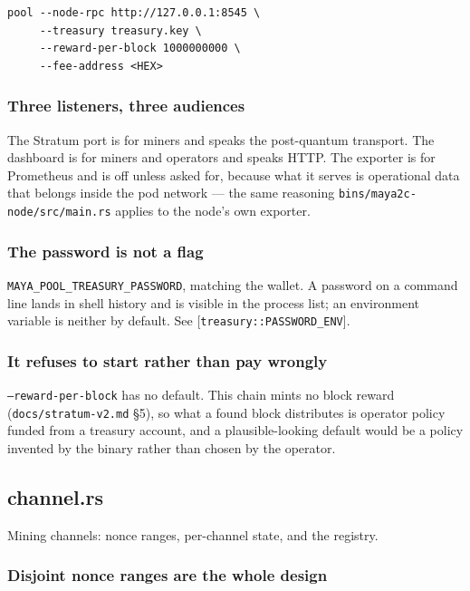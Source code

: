\documentclass[11pt,a4paper]{article}
\begin{document}
\begin{verbatim}
pool --node-rpc http://127.0.0.1:8545 \
     --treasury treasury.key \
     --reward-per-block 1000000000 \
     --fee-address <HEX>
\end{verbatim}

\subsubsection{Three listeners, three audiences}

The Stratum port is for miners and speaks the post-quantum transport. The
dashboard is for miners and operators and speaks HTTP. The exporter is for
Prometheus and is off unless asked for, because what it serves is
operational data that belongs inside the pod network — the same reasoning
\texttt{bins/maya2c-node/src/main.rs} applies to the node's own exporter.

\subsubsection{The password is not a flag}

\texttt{MAYA\_POOL\_TREASURY\_PASSWORD}, matching the wallet. A password on a command
line lands in shell history and is visible in the process list; an
environment variable is neither by default. See [\texttt{treasury::PASSWORD\_ENV}].

\subsubsection{It refuses to start rather than pay wrongly}

\texttt{--reward-per-block} has no default. This chain mints no block reward
(\texttt{docs/stratum-v2.md} §5), so what a found block distributes is operator
policy funded from a treasury account, and a plausible-looking default would
be a policy invented by the binary rather than chosen by the operator.

\subsection{channel.rs}
Mining channels: nonce ranges, per-channel state, and the registry.

\subsubsection{Disjoint nonce ranges are the whole design}
\end{document}
